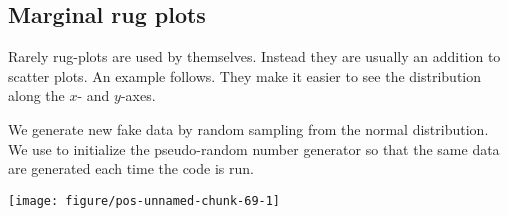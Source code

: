 \documentclass[paper=a4,headsepline,BCOR=12mm,twoside,open=right,%
titlepage,headings=small,fontsize=10pt,index=totoc,bibliography=totoc,%
captions=tableheading,captions=nooneline]{scrbook}\usepackage{knitr}
\begin{document}
\subsection{Marginal rug plots}

Rarely rug-plots are used by themselves. Instead they are usually an addition to
scatter plots. An example follows. They make it easier to see the distribution
along the $x$- and $y$-axes.

We generate new fake data by random sampling from the normal distribution. We use  to initialize the pseudo-random number generator so that
the same data are generated each time the code is run.

\begin{knitrout}\footnotesize
{}\color{fgcolor}\begin{kframe}
\begin{alltt}
\hlstd{(}\hlstd{)}
 \hlkwb{<-}
  \hlstd{(} \hlstd{=} \hlstd{(}\hlstd{),}
              \hlstd{=} \hlstd{(}\hlstd{(}\hlstd{,} \hlopt{-}\hlstd{,} \hlstd{),} \hlstd{(}\hlstd{,} \hlstd{,} \hlstd{)),}
              \hlstd{=} \hlstd{(}\hlstd{(}\hlstd{(}\hlstd{,} \hlstd{),} \hlstd{(}\hlstd{,} \hlstd{))) )}
\end{alltt}
\end{kframe}
\end{knitrout}

\begin{knitrout}\footnotesize
{}\color{fgcolor}\begin{kframe}
\begin{alltt}
    \hlopt{+}
  \hlstd{()} \hlopt{+}
  \hlstd{()}
\end{alltt}
\end{kframe}

{\centering \texttt{[image: figure/pos-unnamed-chunk-69-1]} 

}



\end{knitrout}
\end{document}
